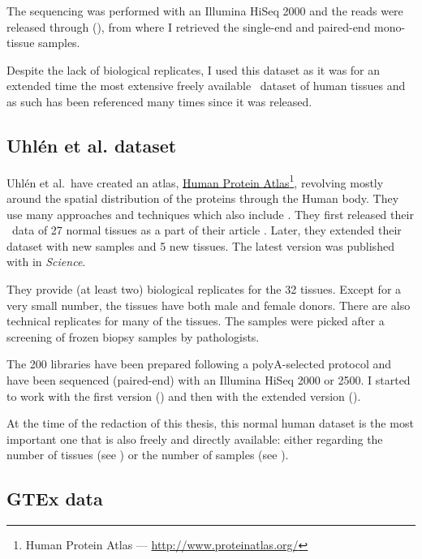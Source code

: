 The sequencing was performed with an Illumina HiSeq 2000 and the reads were
released through  (), from where I
retrieved the single-end and paired-end mono-tissue samples.

Despite the lack of biological replicates, I used this dataset as it was for an
extended time the most extensive freely available \Rnaseq\ dataset of human
tissues and as such has been referenced many times since it was released.

\subsection{Uhlén et al. dataset}

Uhlén et al.\ have created an atlas,
\href{http://www.proteinatlas.org/}{Human Protein Atlas}\footnote{%
Human Protein Atlas ---
\href{http://www.proteinatlas.org/}{http://www.proteinatlas.org/}},
revolving mostly around the spatial
distribution of the proteins through the Human body. They use many approaches
and techniques which also include \Rnaseq. They first released their \Rnaseq\
data of 27 normal tissues as a part of their article 
\citep{Uhlen2014}. Later, they extended their dataset with new samples and 5 new
tissues. The latest version was published with \paper{\citetitle{Uhlen2015}}
\citep{Uhlen2015} in \textit{Science}.

They provide (at least two) biological replicates for the 32 tissues.
Except for a very small number, the tissues have both male and female donors.
There are also technical replicates for many of the tissues. The samples were
picked after a screening of frozen biopsy samples by pathologists.

The 200 libraries have been prepared following a polyA-selected protocol and
have been sequenced (paired-end) with an Illumina HiSeq 2000 or 2500. I started
to work with the first version (\ArrayExpress{E-MTAB-1733}) and then
with the extended version (\ArrayExpress{E-MTAB-2836}).

At the time of the redaction of this thesis, this normal human dataset is the
most important one that is also freely and directly available: either regarding
the number of tissues (see \Cref{tab:Trans5DF})
or the number of samples (see ).


\subsection{GTEx data}

